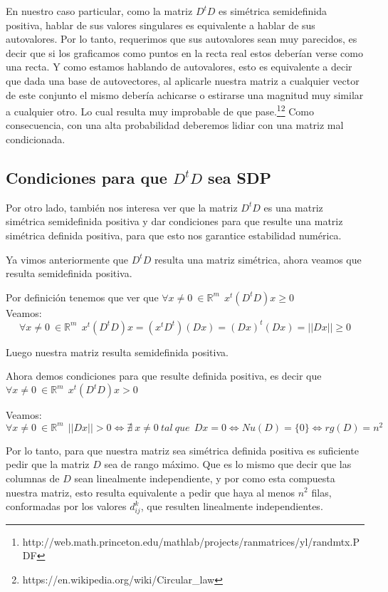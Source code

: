 En nuestro caso particular, como la matriz  $D^{t}D$ es simétrica semidefinida positiva, hablar de sus valores singulares es equivalente a hablar de sus autovalores. Por lo tanto, requerimos que sus autovalores sean muy parecidos, es decir que si los graficamos como puntos en la recta real estos deberían verse como una recta. Y como estamos hablando de autovalores, esto es equivalente a decir que dada una base de autovectores, al aplicarle nuestra matriz a cualquier vector de este conjunto el mismo debería achicarse o estirarse una magnitud muy similar a cualquier otro. Lo cual resulta muy improbable de que pase.\footnote{http://web.math.princeton.edu/mathlab/projects/ranmatrices/yl/randmtx.PDF}\footnote{https://en.wikipedia.org/wiki/Circular\_law} Como consecuencia, con una alta probabilidad deberemos lidiar con una matriz mal condicionada.

\subsection{Condiciones para que $D^{t}D$ sea SDP}
Por otro lado, también nos interesa ver que la matriz $D^{t}D$ es una matriz simétrica semidefinida positiva
y dar condiciones para que resulte una matriz simétrica definida positiva,
para que esto nos garantice estabilidad numérica.

Ya vimos anteriormente que $D^{t}D$ resulta una matriz simétrica, ahora veamos que resulta semidefinida positiva.

Por definición tenemos que ver que $\forall x \neq 0 \ \in \mathbb{R}^{m} \ \ x^{t}(D^{t}D)x \geq 0$\\
Veamos:
\begin{equation*}
    \forall x \neq 0 \ \in \mathbb{R}^{m} \ \ x^{t}(D^{t}D)x = (x^{t}D^{t})(Dx) = (Dx)^{t}(Dx) = ||Dx|| \geq 0
\end{equation*}

Luego nuestra matriz resulta semidefinida positiva. 

Ahora demos condiciones para que resulte definida positiva,
es decir que $\forall x \neq 0 \ \in \mathbb{R}^{m} \ \ x^{t}(D^{t}D)x > 0$

Veamos:
\begin{equation*}
    \forall x \neq 0 \ \in \mathbb{R}^{m} \ \ ||Dx|| > 0 \Leftrightarrow \nexists \ x \neq 0 \ tal  \ que \ \ Dx = 0 \Leftrightarrow Nu(D) = \lbrace0\rbrace  \Leftrightarrow rg(D) = n^{2}
\end{equation*}

Por lo tanto, para que nuestra matriz sea simétrica definida positiva es suficiente pedir que la matriz $D$ sea de rango máximo. Que es lo mismo que decir que las columnas de $D$ sean linealmente independiente, y por como esta compuesta nuestra matriz, esto resulta equivalente a pedir que haya al menos $n^{2}$ filas, conformadas por los valores $d^{k}_{ij}$, que resulten linealmente independientes.

